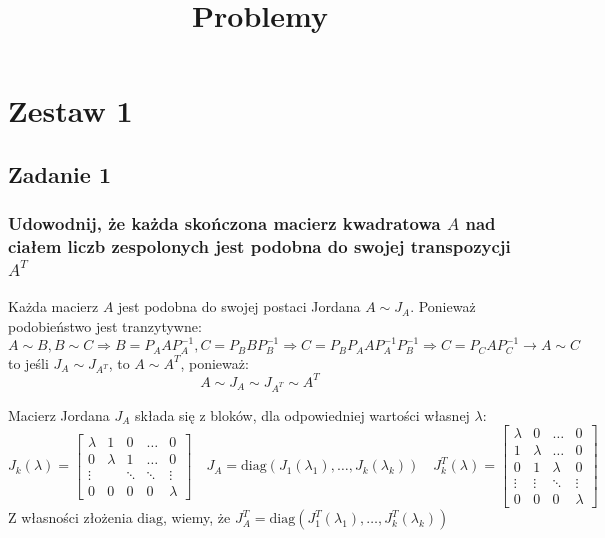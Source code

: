 \documentclass{../notatki}
\title{Problemy}
\begin{document}
\section{Zestaw 1}

\subsection{Zadanie 1}

\subsubsection{Udowodnij, że każda skończona macierz kwadratowa $A$ nad ciałem
  liczb zespolonych jest podobna do swojej transpozycji
\texorpdfstring{$A^T$}{A\^T}}

Każda macierz $A$ jest podobna do swojej postaci Jordana $A \sim J_A$.
Ponieważ podobieństwo jest tranzytywne:
$$
A \sim B, B \sim C \Rightarrow B = P_A A P_A^{-1}, C = P_B B P_B^{-1}
\Rightarrow C =  P_B P_A A P_A^{-1} P_B^{-1} \Rightarrow C = P_C A P_C^{-1}
\rightarrow A \sim C
$$
to jeśli $J_A \sim J_{A^T}$, to $A \sim A^T$, ponieważ:
$$
A \sim J_A \sim J_{A^T} \sim A^T
$$

Macierz Jordana $J_A$ składa się z bloków, dla odpowiedniej wartości
własnej $\lambda$:
$$
J_k(\lambda) =
\begin{bmatrix}
  \lambda & 1 & 0 & \hdots & 0 \\
  0 & \lambda & 1 & \hdots & 0 \\
  \vdots & & \ddots & \ddots & \vdots \\
  0 & 0 & 0 & 0 & \lambda
\end{bmatrix}
\quad J_A = \textrm{diag}(J_1(\lambda_1), \dots, J_k(\lambda_k))
\quad J_k^T(\lambda) =
\begin{bmatrix}
  \lambda & 0 & \hdots & 0 \\
  1 & \lambda & \hdots & 0 \\
  0 & 1 & \lambda & 0 \\
  \vdots & \vdots& \ddots & \vdots \\
  0 & 0 & 0 & \lambda
\end{bmatrix}
$$
Z własności złożenia $\textrm{diag}$, wiemy, że $J_A^T =
\textrm{diag}(J_1^T(\lambda_1), \dots, J_k^T(\lambda_k))$
\end{document}

